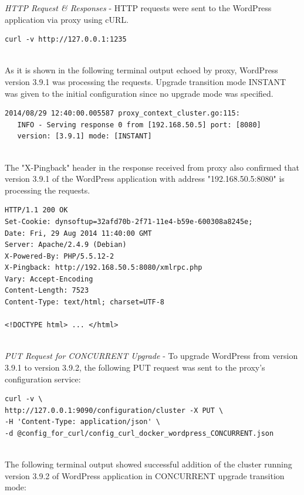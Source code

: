 \documentclass[a4paper,11pt,twoside]{report}
\begin{document}
\noindent
\textit{HTTP Request \& Responses} - HTTP requests were sent to the WordPress application via proxy using cURL.
\begin{lstlisting}[language=terminal]
curl -v http://127.0.0.1:1235
\end{lstlisting}  

\noindent\\
As it is shown in the following terminal output echoed by proxy, WordPress version 3.9.1 was processing the requests. Upgrade transition mode INSTANT was given to the initial configuration since no upgrade mode was specified. \smallskip

\begin{lstlisting}[language=terminal]
2014/08/29 12:40:00.005587 proxy_context_cluster.go:115:     
   INFO - Serving response 0 from [192.168.50.5] port: [8080] 
   version: [3.9.1] mode: [INSTANT]
\end{lstlisting}  

\noindent\\
The "X-Pingback" header in the response received from proxy also confirmed that version 3.9.1 of the WordPress application with address "192.168.50.5:8080" is processing the requests. \smallskip 

\begin{lstlisting}[language=terminal]
HTTP/1.1 200 OK
Set-Cookie: dynsoftup=32afd70b-2f71-11e4-b59e-600308a8245e;
Date: Fri, 29 Aug 2014 11:40:00 GMT
Server: Apache/2.4.9 (Debian)
X-Powered-By: PHP/5.5.12-2
X-Pingback: http://192.168.50.5:8080/xmlrpc.php
Vary: Accept-Encoding
Content-Length: 7523
Content-Type: text/html; charset=UTF-8
 
<!DOCTYPE html> ... </html>
\end{lstlisting} 

\noindent\\
\textit{PUT Request for CONCURRENT Upgrade} - To upgrade WordPress from version 3.9.1 to version 3.9.2, the following PUT request was sent to the proxy's configuration service: \smallskip

\begin{lstlisting}[language=terminal]
curl -v \
http://127.0.0.1:9090/configuration/cluster -X PUT \
-H 'Content-Type: application/json' \ 
-d @config_for_curl/config_curl_docker_wordpress_CONCURRENT.json
\end{lstlisting}  

\noindent\\
The following terminal output showed successful addition of the cluster running version 3.9.2 of WordPress application in CONCURRENT upgrade transition mode:\smallskip
\end{document}
